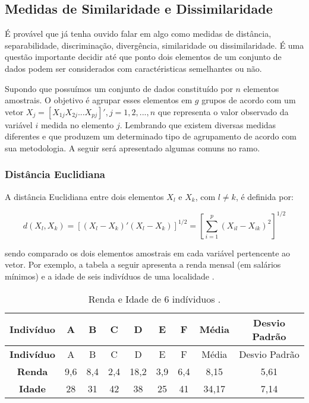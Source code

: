 \documentclass[
]{book}
\begin{document}
\hypertarget{meddist}{%
\subsection{Medidas de Similaridade e Dissimilaridade}\label{meddist}}

É provável que já tenha ouvido falar em algo como medidas de distância, separabilidade, discriminação, divergência, similaridade ou dissimilaridade. É uma questão importante decidir até que ponto dois elementos de um conjunto de dados podem ser considerados com caractéristicas semelhantes ou não.

Supondo que possuímos um conjunto de dados constituído por \(n\) elementos amostrais. O objetivo é agrupar esses elementos em \(g\) grupos de acordo com um vetor \(X_j=[X_{1j}X_{2j}...X_{pj}]', j=1,2,...,n\) que representa o valor observado da variável \(i\) medida no elemento \(j\). Lembrando que existem diversas medidas diferentes e que produzem um determinado tipo de agrupamento de acordo com sua metodologia. A seguir será apresentado algumas comuns no ramo.

\hypertarget{disteuclidana}{%
\subsubsection{Distância Euclidiana}\label{disteuclidana}}

A distância Euclidiana entre dois elementos \(X_l\) e \(X_k\), com \(l \neq k\), é definida por:

\begin{equation} 
  d(X_l,X_k)=[(X_l-X_k)'(X_l - X_k)]^{1/2}=[\displaystyle \sum^p_{i=1}(X_{il}-X_{ik})^2]^{1/2}
  \label{eq:euclidiana}
\end{equation}

sendo comparado os dois elementos amostrais em cada variável pertencente ao vetor. Por exemplo, a tabela a seguir apresenta a renda mensal (em salários mínimos) e a idade de seis indivíduos de uma localidade \citep{mingoti2007analise}.

\begin{longtable}[]{@{}ccccccccc@{}}
\caption{\label{tab:dadossrendaa} Renda e Idade de 6 indíviduos \citep{mingoti2007analise}.}\tabularnewline
\toprule
\textbf{Indivíduo} & A & B & C & D & E & F & Média & Desvio Padrão\tabularnewline
\midrule
\endfirsthead
\toprule
\textbf{Indivíduo} & A & B & C & D & E & F & Média & Desvio Padrão\tabularnewline
\midrule
\endhead
\textbf{Renda} & 9,6 & 8,4 & 2,4 & 18,2 & 3,9 & 6,4 & 8,15 & 5,61\tabularnewline
\textbf{Idade} & 28 & 31 & 42 & 38 & 25 & 41 & 34,17 & 7,14\tabularnewline
\bottomrule
\end{longtable}
\end{document}

